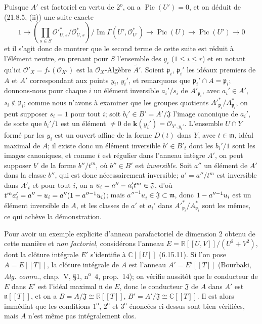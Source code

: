 \begin{examples}[21.13.9]
Puisque $A'$ est factoriel en vertu de
$2^{\mathrm o}$, on a $\operatorname{Pic}(U')=0$, et on déduit de (21.8.5, (ii)) une
suite exacte
\[
  1\longrightarrow
  \left(\prod_{s\in S}
  \mathcal O'^*_{U,s}/\mathcal O^*_{U,s}\right)
  \big/\operatorname{Im}\Gamma(U',\mathcal O_{U'}^*)
  \longrightarrow\operatorname{Pic}(U)\longrightarrow\operatorname{Pic}(U')
  \longrightarrow0
\]
et il s'agit donc de montrer que le second terme de cette suite est réduit à l'élément
neutre, en prenant pour $S$ l'ensemble des $y_i$ ($1\leq i\leq r$) et en notant
qu'ici $\mathcal O'_X=f_*(\mathcal O_{X'})$ est la $\mathcal O_X$-Algèbre $\widetilde{A'}$. Soient
$\mathfrak p_i$, $\mathfrak p_i'$ les idéaux premiers de $A$ et $A'$ correspondant
aux points $y_i$, $y_i'$, et remarquons que $\mathfrak p_i'\cap A=\mathfrak p_i$;
donnons-nous pour chaque $i$ un élément inversible $a_i'/s_i$ de
$A'_{\mathfrak p_i}$, avec $a_i'\in A'$, $s_i\notin\mathfrak p_i$; comme nous
n'avons à examiner que les groupes quotients
$A'^*_{\mathfrak p_i}/A^*_{\mathfrak p_i}$, on peut supposer $s_i=1$ pour tout
$i$; soit $b_i'\in B'=A'/\mathfrak J$ l'image canonique de $a_i'$, de sorte que
$b_i'/1$ est un élément $\neq0$ de $\boldsymbol{k}(y_i')=\mathcal O_{Y',y_i'}$. L'ensemble
$U\cap Y$ formé par les $y_i$ est un ouvert affine de la forme $D(t)$ dans $Y$, avec
$t\in\mathfrak m$, idéal maximal de $A$; il existe donc un élément inversible
$b'\in B'_t$ dont les $b_i'/1$ sont les images canoniques, et comme $t$ est régulier
dans l'anneau intègre $A'$, on peut supposer $b'$ de la forme $b''/t^m$, où
$b''\in B'$ est \emph{inversible}. Soit $a''$ un élément de $A'$ dans la classe $b''$, qui
est donc nécessairement inversible; $a'=a''/t^m$ est inversible dans $A'_t$ et pour
tout $i$, on a $u_i=a''- a_i't^m\in\mathfrak J$, d'où $t^m a_i'=a''- u_i=a''(1- a''^{-1}u_i)$;
mais $a''^{-1}u_i\in\mathfrak J\subset\mathfrak m$, donc $1- a''^{-1}u_i$ est un
élément inversible de $A$, et les classes de $a'$ et $a_i'$ dans
$A'^*_{\mathfrak p_i}/A^*_{\mathfrak p_i}$ sont les mêmes, ce qui achève la
démonstration.

Pour avoir un exemple explicite d'anneau parafactoriel de dimension $2$ obtenu de
cette manière et \emph{non factoriel}, considérons l'anneau
$E=\mathbb R[[U,V]]/(U^2+V^2)$, dont la clôture intégrale $E'$ s'identifie à $\mathbb C[[U]]$ (6.15.11). Si l'on pose
$A=E[[T]]$, la clôture intégrale de $A$ est l'anneau $A'=E'[[T]]$ (Bourbaki,
\emph{Alg. comm.}, chap.~V, \S1, n\textsuperscript{o}~4, prop.~14); on vérifie
aussitôt que le conducteur de $E$ dans $E'$ est l'idéal maximal $\mathfrak n$ de
$E$, donc le conducteur $\mathfrak J$ de $A$ dans $A'$ est $\mathfrak n[[T]]$, et on
a $B=A/\mathfrak J\cong\mathbb R[[T]]$, $B'=A'/\mathfrak J\cong\mathbb C[[T]]$.
Il est alors immédiat que les conditions $1^{\mathrm o}$, $2^{\mathrm o}$ et
$3^{\mathrm o}$ énoncées ci-dessus sont bien vérifiées, mais $A$ n'est même pas
intégralement clos.


\end{examples}
